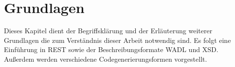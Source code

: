 \chapter{Grundlagen}


Dieses Kapitel dient der Begriffsklärung und der Erläuterung weiterer Grundlagen die zum Verständnis dieser Arbeit notwendig sind. Es folgt eine Einführung in \gls{REST} sowie der Beschreibungsformate \gls{WADL} und \gls{XSD}. Außerdem werden verschiedene Codegenerierungsformen vorgestellt.








